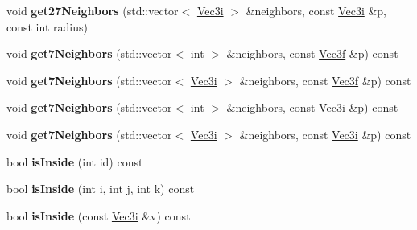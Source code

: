 \begin{DoxyCompactItemize}
\item 
\hypertarget{classhokusai_1_1GridUtility_a184d7b91aa8ef2c6237a556f5a7f4fc9}{void {\bfseries get27\+Neighbors} (std\+::vector$<$ \hyperlink{classhokusai_1_1Vec3}{Vec3i} $>$ \&neighbors, const \hyperlink{classhokusai_1_1Vec3}{Vec3i} \&p, const int radius)}\label{classhokusai_1_1GridUtility_a184d7b91aa8ef2c6237a556f5a7f4fc9}

\item 
\hypertarget{classhokusai_1_1GridUtility_a9dfb30157e255b236e602feef8bf879b}{void {\bfseries get7\+Neighbors} (std\+::vector$<$ int $>$ \&neighbors, const \hyperlink{classhokusai_1_1Vec3}{Vec3f} \&p) const }\label{classhokusai_1_1GridUtility_a9dfb30157e255b236e602feef8bf879b}

\item 
\hypertarget{classhokusai_1_1GridUtility_a9e827af8ecfd4a93c199a264b149fe27}{void {\bfseries get7\+Neighbors} (std\+::vector$<$ \hyperlink{classhokusai_1_1Vec3}{Vec3i} $>$ \&neighbors, const \hyperlink{classhokusai_1_1Vec3}{Vec3f} \&p) const }\label{classhokusai_1_1GridUtility_a9e827af8ecfd4a93c199a264b149fe27}

\item 
\hypertarget{classhokusai_1_1GridUtility_a06f2baa86676f9f12d841bce7bc61990}{void {\bfseries get7\+Neighbors} (std\+::vector$<$ int $>$ \&neighbors, const \hyperlink{classhokusai_1_1Vec3}{Vec3i} \&p) const }\label{classhokusai_1_1GridUtility_a06f2baa86676f9f12d841bce7bc61990}

\item 
\hypertarget{classhokusai_1_1GridUtility_a4eae66725161af85da7bc63cabf9032f}{void {\bfseries get7\+Neighbors} (std\+::vector$<$ \hyperlink{classhokusai_1_1Vec3}{Vec3i} $>$ \&neighbors, const \hyperlink{classhokusai_1_1Vec3}{Vec3i} \&p) const }\label{classhokusai_1_1GridUtility_a4eae66725161af85da7bc63cabf9032f}

\item 
\hypertarget{classhokusai_1_1GridUtility_a75633f5dc45150da2ace83a9b255d4e3}{bool {\bfseries is\+Inside} (int id) const }\label{classhokusai_1_1GridUtility_a75633f5dc45150da2ace83a9b255d4e3}

\item 
\hypertarget{classhokusai_1_1GridUtility_a49e5f816ee8532fc30a862f6d6078a4c}{bool {\bfseries is\+Inside} (int i, int j, int k) const }\label{classhokusai_1_1GridUtility_a49e5f816ee8532fc30a862f6d6078a4c}

\item 
\hypertarget{classhokusai_1_1GridUtility_aec9876ba91de3fe8eb7fa5bf2cccf29a}{bool {\bfseries is\+Inside} (const \hyperlink{classhokusai_1_1Vec3}{Vec3i} \&v) const }\label{classhokusai_1_1GridUtility_aec9876ba91de3fe8eb7fa5bf2cccf29a}


\end{DoxyCompactItemize}
